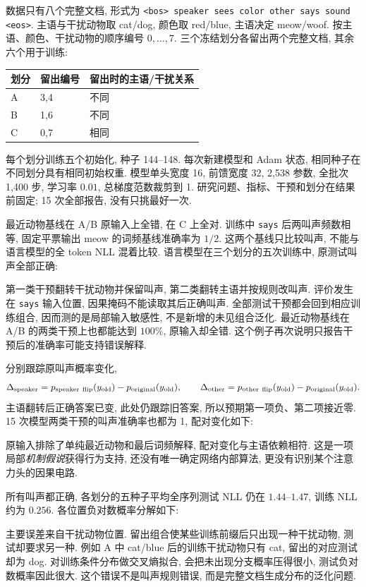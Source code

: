 数据只有八个完整文档, 形式为 \texttt{<bos> speaker sees color other says sound <eos>}. 主语与干扰动物取 cat/dog, 颜色取 red/blue, 主语决定 meow/woof. 按主语、颜色、干扰动物的顺序编号 $0,\ldots,7$. 三个冻结划分各留出两个完整文档, 其余六个用于训练:
\begin{center}
\begin{tabular}{lll}\toprule
划分 & 留出编号 & 留出时的主语/干扰关系\\\midrule
A & 3,4 & 不同\\
B & 1,6 & 不同\\
C & 0,7 & 相同\\\bottomrule
\end{tabular}
\end{center}
每个划分训练五个初始化, 种子 144--148. 每次新建模型和 Adam 状态, 相同种子在不同划分具有相同初始权重. 模型单头宽度 16, 前馈宽度 32, 2,538 参数, 全批次 1,400 步, 学习率 $0.01$, 总梯度范数裁剪到 1. 研究问题、指标、干预和划分在结果前固定; 15 次全部报告, 没有只挑最好一次.

最近动物基线在 A/B 原输入上全错, 在 C 上全对. 训练中 \texttt{says} 后两叫声频数相等, 固定平票输出 meow 的词频基线准确率为 $1/2$. 这两个基线只比较叫声, 不能与语言模型的全 token NLL 混着比较. 语言模型在三个划分的五次训练中, 原测试叫声全部正确:



第一类干预翻转干扰动物并保留叫声, 第二类翻转主语并按规则改叫声. 评价发生在 \texttt{says} 输入位置, 因果掩码不能读取其后正确叫声. 全部测试干预都会回到相应训练组合, 因而测的是局部输入敏感性, 不是新增的未见组合泛化. 最近动物基线在 A/B 的两类干预上也都能达到 $100\%$, 原输入却全错. 这个例子再次说明只报告干预后的准确率可能支持错误解释.

分别跟踪原叫声概率变化,
\[
\Delta_{\rm speaker}=p_{\rm speaker\ flip}(y_{\rm old})-p_{\rm original}(y_{\rm old}),\qquad
\Delta_{\rm other}=p_{\rm other\ flip}(y_{\rm old})-p_{\rm original}(y_{\rm old}).
\]
主语翻转后正确答案已变, 此处仍跟踪旧答案, 所以预期第一项负、第二项接近零. 15 次模型两类干预的叫声准确率也都为 1, 配对变化如下:

原输入排除了单纯最近动物和最后词频解释, 配对变化与主语依赖相符. 这是一项局部\emph{机制假说}获得行为支持, 还没有唯一确定网络内部算法, 更没有识别某个注意力头的因果电路.

所有叫声都正确, 各划分的五种子平均全序列测试 NLL 仍在 $1.44$--$1.47$, 训练 NLL 约为 $0.256$. 各位置负对数概率分解如下:

主要误差来自干扰动物位置. 留出组合使某些训练前缀后只出现一种干扰动物, 测试却要求另一种. 例如 A 中 cat/blue 后的训练干扰动物只有 cat, 留出的对应测试却为 dog. 对训练条件分布做交叉熵拟合, 会把未出现分支概率压得很小, 测试负对数概率因此很大. 这个错误不是叫声规则错误, 而是完整文档生成分布的泛化问题.

